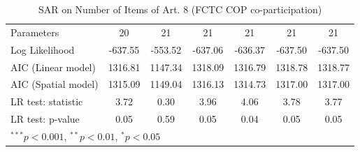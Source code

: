 \begin{table}[!h]
\begin{center}
\begin{tabular}{l c c c c c c }
Parameters              & 20           & 21           & 21           & 21           & 21           & 21           \\
Log Likelihood          & -637.55      & -553.52      & -637.06      & -636.37      & -637.50      & -637.50      \\
AIC (Linear model)      & 1316.81      & 1147.34      & 1318.09      & 1316.79      & 1318.78      & 1318.77      \\
AIC (Spatial model)     & 1315.09      & 1149.04      & 1316.13      & 1314.73      & 1317.00      & 1317.00      \\
LR test: statistic      & 3.72         & 0.30         & 3.96         & 4.06         & 3.78         & 3.77         \\
LR test: p-value        & 0.05         & 0.59         & 0.05         & 0.04         & 0.05         & 0.05         \\
\bottomrule
\multicolumn{7}{l}{\scriptsize{$^{***}p<0.001$, $^{**}p<0.01$, $^*p<0.05$}}
\end{tabular}
\caption{SAR on Number of Items of Art. 8 (FCTC COP co-participation)}
\label{table:coefficients}
\end{center}
\end{table}
